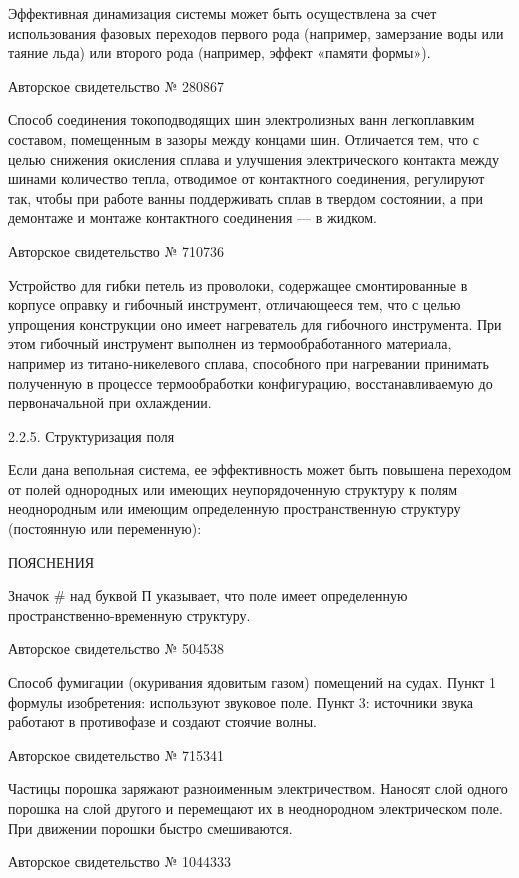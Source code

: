 Эффективная  динамизация  системы  может  быть  осуществлена  за  счет
использования  фазовых переходов  первого  рода (например,  замерзание
воды  или таяние  льда)  или второго  рода  (например, эффект  «памяти
формы»).


Авторское свидетельство № 280867

Способ соединения  токоподводящих шин электролизных  ванн легкоплавким
составом, помещенным в зазоры между концами шин. Отличается тем, что с
целью снижения  окисления сплава  и улучшения  электрического контакта
между шинами  количество тепла,  отводимое от  контактного соединения,
регулируют так,  чтобы при работе  ванны поддерживать сплав  в твердом
состоянии,  а  при демонтаже  и  монтаже  контактного соединения  —  в
жидком.


Авторское свидетельство № 710736

Устройство для гибки петель  из проволоки, содержащее смонтированные в
корпусе оправку и  гибочный инструмент, отличающееся тем,  что с целью
упрощения конструкции оно имеет нагреватель для гибочного инструмента.
При этом гибочный инструмент выполнен из термообработанного материала,
например  из  титано-никелевого   сплава,  способного  при  нагревании
принимать   полученную   в   процессе   термообработки   конфигурацию,
восстанавливаемую до первоначальной при охлаждении.


2.2.5. Структуризация поля

Если  дана вепольная  система,  ее эффективность  может быть  повышена
переходом от полей однородных  или имеющих неупорядоченную структуру к
полям неоднородным или имеющим определенную пространственную структуру
(постоянную или переменную):


ПОЯСНЕНИЯ

Значок  \#  над  буквой  П  указывает,  что  поле  имеет  определенную
пространственно-временную структуру.


Авторское свидетельство № 504538

Способ фумигации (окуривания ядовитым газом) помещений на судах. Пункт
1 формулы  изобретения: используют  звуковое поле. Пункт  3: источники
звука работают в противофазе и создают стоячие волны.


Авторское свидетельство № 715341

Частицы  порошка заряжают  разноименным  электричеством. Наносят  слой
одного  порошка  на  слой  другого  и  перемещают  их  в  неоднородном
электрическом поле. При движении порошки быстро смешиваются.


Авторское свидетельство № 1044333

